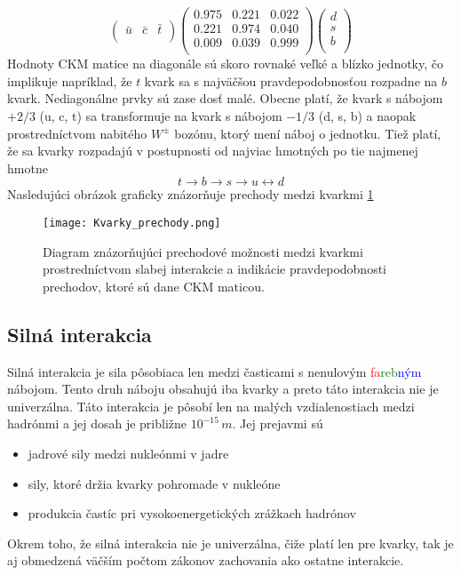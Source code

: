 \documentclass[../../main.tex]{subfiles}
\begin{document}
\[
\begin{pmatrix}
    \bar{u} & \bar{c} & \bar{t} \\
\end{pmatrix} 
\begin{pmatrix}
    0.975 & 0.221 & 0.022 \\
    0.221 & 0.974 & 0.040 \\
    0.009 & 0.039 & 0.999 \\
\end{pmatrix}
\begin{pmatrix}
    d \\
    s \\
    b \\
\end{pmatrix}
\]
Hodnoty CKM matice na diagonále sú skoro rovnaké veľké a blízko jednotky, čo implikuje napríklad, že $t$ kvark sa s najväčšou pravdepodobnosťou rozpadne na $b$ kvark. Nediagonálne prvky sú zase dosť malé. Obecne platí, že kvark s nábojom $+2/3$ (u, c, t) sa transformuje na kvark s nábojom $-1/3$ (d, s, b) a naopak prostredníctvom nabitého $W^{\pm}$ bozónu, ktorý mení náboj o jednotku. Tiež platí, že sa kvarky rozpadajú v postupnosti od najviac hmotných po tie najmenej hmotne 
$$
t\rightarrow b\rightarrow s\rightarrow u \leftrightarrow d
$$
Nasledujúci obrázok graficky znázorňuje prechody medzi kvarkmi \ref{sf1:fig:Kvarky_prechody}
\begin{figure}[!h]
\centering
\texttt{[image: Kvarky\_prechody.png]}
\caption{Diagram znázorňujúci prechodové možnosti medzi kvarkmi prostredníctvom slabej interakcie a indikácie pravdepodobnosti prechodov, ktoré sú dane CKM maticou.}
\caption{}
\label{sf1:fig:Kvarky_prechody}
\end{figure}

\subsection{Silná interakcia}
Silná interakcia je sila pôsobiaca len medzi časticami s nenulovým \textcolor{red}{fa}\textcolor{green}{reb}\textcolor{blue}{ným} nábojom. Tento druh náboju obsahujú iba kvarky a preto táto interakcia nie je univerzálna. Táto interakcia je pôsobí len na malých vzdialenostiach medzi hadrónmi a jej dosah je približne $10^{-15}\,m$. Jej prejavmi sú 
\begin{itemize}
	\item jadrové sily medzi nukleónmi v jadre  
	\item sily, ktoré držia kvarky pohromade v nukleóne
	\item produkcia častíc pri vysokoenergetických zrážkach hadrónov
\end{itemize}
Okrem toho, že silná interakcia nie je univerzálna, čiže platí len pre kvarky, tak je aj obmedzená väčším počtom zákonov zachovania ako ostatne interakcie.
\end{document}
